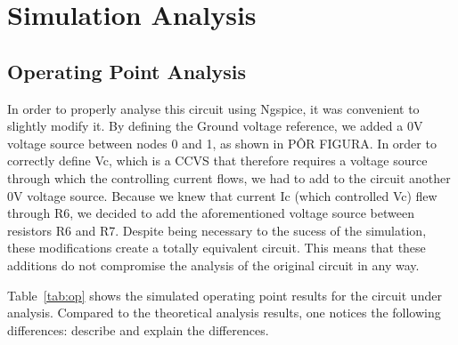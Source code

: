 \section{Simulation Analysis}
\label{sec:simulation}

\subsection{Operating Point Analysis}

In order to properly analyse this circuit using Ngspice, it was convenient to slightly modify it. By defining the Ground voltage reference, we added a 0V voltage source between nodes 0 and 1, as shown in PÔR FIGURA. In order to correctly define Vc, which is a CCVS that therefore requires a voltage source through which the controlling current flows, we had to add to the circuit another 0V voltage source. Because we knew that current Ic (which controlled Vc) flew through R6, we decided to add the aforementioned voltage source between resistors R6 and R7.
Despite being necessary to the sucess of the simulation, these modifications create a totally equivalent circuit. This means that these additions do not compromise the analysis of the original circuit in any way.


Table~\ref{tab:op} shows the simulated operating point results for the circuit
under analysis. Compared to the theoretical analysis results, one notices the
following differences: describe and explain the differences.





